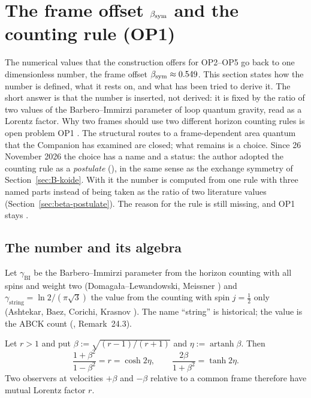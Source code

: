 \section{The frame offset \texorpdfstring{$\beta_{\mathrm{sym}}$}{beta\_sym} and the counting rule (OP1)}
\label{sec:beta}

The numerical values that the construction offers for OP2--OP5 go back to one dimensionless number, the frame offset $\beta_{\mathrm{sym}}\approx0.549$.
This section states how the number is defined, what it rests on, and what has been tried to derive it.  The short answer is that the
number is inserted, not derived: it is fixed by the ratio of two values of the Barbero--Immirzi parameter of loop quantum gravity, read as a Lorentz
factor.  Why two frames should use two different horizon counting rules is open problem OP1 \Open.  The structural routes to a frame-dependent
area quantum that the Companion has examined are closed; what remains is a choice.  Since 26 November 2026 the choice has a name and a status:
the author adopted the counting rule as a \emph{postulate} (), in the same sense as the exchange symmetry of Section~\ref{sec:B-koide}.
With it the number is computed from one rule with three named parts instead of being taken as the ratio of two literature values
(Section~\ref{sec:beta-postulate}).  The reason for the rule is still missing, and OP1 stays \Open.

\subsection{The number and its algebra}
\label{sec:beta-number}

Let $\gamma_{\mathrm{BI}}$ be the Barbero--Immirzi parameter from the horizon counting with all spins and weight two
(Domaga{\l}a--Lewandowski, Meissner \cite{DomagalaLewandowski2004,Meissner2004}) and $\gamma_{\mathrm{string}}=\ln2/(\pi\sqrt3)$ the value from the
counting with spin $j=\tfrac12$ only (Ashtekar, Baez, Corichi, Krasnov \cite{ABCK1998}).  The name ``string'' is historical; the value is the
ABCK count (, Remark~24.3).

\begin{proposition}
\label{prop:beta-symmetric}
Let $r>1$ and put $\beta:=\sqrt{(r-1)/(r+1)}$ and $\eta:=\operatorname{artanh}\beta$.  Then
\begin{equation}
 \frac{1+\beta^2}{1-\beta^2}=r=\cosh2\eta,\qquad
 \frac{2\beta}{1+\beta^2}=\tanh2\eta .
 \label{eq:beta-gL}
\end{equation}
Two observers at velocities $+\beta$ and $-\beta$ relative to a common frame therefore have mutual Lorentz factor $r$.
\end{proposition}

